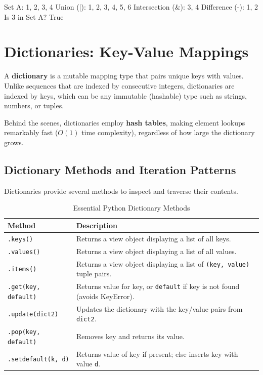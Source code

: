 \begin{outputbox}
Set A: {1, 2, 3, 4}
Union (|): {1, 2, 3, 4, 5, 6}
Intersection (&): {3, 4}
Difference (-): {1, 2}
Is 3 in Set A? True
\end{outputbox}

\section{Dictionaries: Key-Value Mappings}

A \textbf{dictionary} is a mutable mapping type that pairs unique keys with values. Unlike sequences that are indexed by consecutive integers, dictionaries are indexed by keys, which can be any immutable (hashable) type such as strings, numbers, or tuples.

Behind the scenes, dictionaries employ \textbf{hash tables}, making element lookups remarkably fast ($O(1)$ time complexity), regardless of how large the dictionary grows.

\subsection{Dictionary Methods and Iteration Patterns}

Dictionaries provide several methods to inspect and traverse their contents.

\begin{table}[H]
    \centering\sffamily
    
    \begin{tabular}{p{4.5cm} p{10cm}}
    \toprule
    \textbf{Method} & \textbf{Description} \\
    \midrule
    \texttt{.keys()} & Returns a view object displaying a list of all keys. \\
    \texttt{.values()} & Returns a view object displaying a list of all values. \\
    \texttt{.items()} & Returns a view object displaying a list of \texttt{(key, value)} tuple pairs. \\
    \texttt{.get(key, default)} & Returns value for key, or \texttt{default} if key is not found (avoids KeyError). \\
    \texttt{.update(dict2)} & Updates the dictionary with the key/value pairs from \texttt{dict2}. \\
    \texttt{.pop(key, default)} & Removes key and returns its value. \\
    \texttt{.setdefault(k, d)} & Returns value of key if present; else inserts key with value \texttt{d}. \\
    \bottomrule
    \end{tabular}
    \caption{Essential Python Dictionary Methods}
\end{table}

